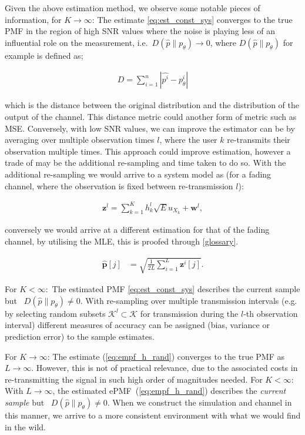 \documentclass{article}
\begin{document}
Given the above estimation method, we observe some notable pieces of information, for $K \rightarrow \infty$: The estimate \cref{eq:est_const_sys} converges to the true PMF in the region of high SNR values where the noise is playing less of an influential role on the measurement, i.e.~$D(\hat{p}\| p_{\theta}) \rightarrow 0$, where $D(\hat{p}\| p_{\theta})$ for example is defined as;

\begin{align}
    D = \sum_{i=1}^n |\hat{p^i} - p_{\theta}^i|
\end{align}

which is the distance between the original distribution and the distribution of the output of the channel. This distance metric could another form of metric such as \ac{MSE}. Conversely, with low SNR values, we can improve the estimator can be by averaging over multiple observation times $l$, where the user $k$ re-transmits their observation multiple times. This approach could improve estimation, however a trade of may be the additional re-sampling and time taken to do so. With the additional re-sampling we would arrive to a system model as (for a fading channel, where the observation is fixed between re-transmission $l$):

\begin{align}
    \boldsymbol{z}^l = \sum_{k=1}^K h_k^l  \sqrt{E}u_{X_k} + \boldsymbol{w}^l, \label{eq:system_model_retrans}
\end{align}


conversely we would arrive at a different estimation for that of the fading channel, by utilising the \ac{MLE}, this is proofed through \cref{glossary}. 


\begin{align}
    \boldsymbol{\hat{p}}[j] &= \sqrt{\frac{1}{2L} \sum_{i = 1}^{L}\boldsymbol{z}^i[j]}.\label{eq:empf_h_rand}
\end{align}

For $K <\infty:$ The estimated PMF \cref{eq:est_const_sys} describes the current sample but ~$D(\hat{p}\| p_{\theta}) \neq 0$. With re-sampling over multiple transmission intervals (e.g. by selecting random subsets $\mathcal{K}^l \subset \mathcal{K}$ for transmission during the $l$-th observation interval) different measures of accuracy can be assigned (bias, variance or prediction error) to the sample estimates.

For $K \rightarrow \infty$: The estimate (\ref{eq:empf_h_rand}) converges to the true PMF as $L \rightarrow \infty$. However, this is not of practical relevance, due to the associated costs in re-transmitting the signal in such high order of magnitudes needed. For $K <\infty:$ With $L \rightarrow \infty$, the estimated ePMF~(\ref{eq:empf_h_rand}) describes the \emph{current sample} but ~$D(\hat{p}\| p_{\theta}) \neq 0$. When we construct the simulation and channel in this manner, we arrive to a more consistent environment with what we would find in the wild.
\end{document}
